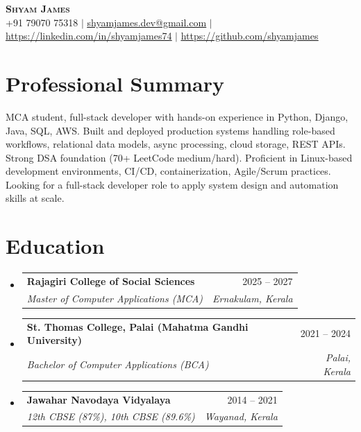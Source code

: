 \documentclass[a4paper,11pt]{article}
\makeatletter
\newcommand{\resumeSubheading}[4]{
  \vspace{-2pt}\item
    \begin{tabular*}{0.97\textwidth}[t]{l@{\extracolsep{\fill}}r}
      \textbf{#1} & #2 \\
      \textit{\small#3} & \textit{\small #4} \\
    \end{tabular*}\vspace{-7pt}
}
\newcommand{\resumeSubHeadingListStart}{\begin{itemize}[leftmargin=0.15in, label={}]}
\newcommand{\resumeSubHeadingListEnd}{\end{itemize}}
\makeatother
\begin{document}
\begin{center}
    \textbf{\Huge \scshape Shyam James} \\ \vspace{5pt}
    \small +91 79070 75318 $|$ \href{mailto:shyamjames.dev@gmail.com}{\underline{shyamjames.dev@gmail.com}} $|$ 
    \href{https://linkedin.com/in/shyamjames74}{\underline{https://linkedin.com/in/shyamjames74}} $|$
    \href{https://github.com/shyamjames}{\underline{https://github.com/shyamjames}}
\end{center}

\section{Professional Summary}
\vspace{2pt}
\small{MCA student, full-stack developer with hands-on experience in Python, Django, Java, SQL, AWS. Built and deployed production systems handling role-based workflows, relational data models, async processing, cloud storage, REST APIs. Strong DSA foundation (70+ LeetCode medium/hard). Proficient in Linux-based development environments, CI/CD, containerization, Agile/Scrum practices. Looking for a full-stack developer role to apply system design and automation skills at scale.}

\section{Education}
  \resumeSubHeadingListStart
    \resumeSubheading
      {Rajagiri College of Social Sciences}{2025 -- 2027}
      {Master of Computer Applications (MCA)}{Ernakulam, Kerala}
    \resumeSubheading
      {St. Thomas College, Palai (Mahatma Gandhi University)}{2021 -- 2024}
      {Bachelor of Computer Applications (BCA)}{Palai, Kerala}
    \resumeSubheading
      {Jawahar Navodaya Vidyalaya}{2014 -- 2021}
      {12th CBSE (87\%), 10th CBSE (89.6\%)}{Wayanad, Kerala}
  \resumeSubHeadingListEnd

\end{document}

